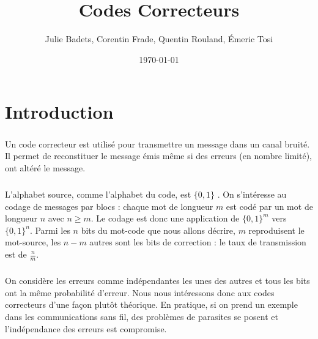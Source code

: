 \documentclass[a4paper,11pt]{report}
\title{Codes Correcteurs}
\author{Julie Badets, Corentin Frade, Quentin Rouland, Émeric Tosi}
\date{\today}
\begin{document}
    \maketitle{} %



    \setcounter{tocdepth}{1} %
    \renewcommand{\contentsname}{Sommaire} %
    \tableofcontents{} %
    \clearpage



\chapter*{Introduction}
        \paragraph{}
Un code correcteur est utilisé pour transmettre un message dans un canal bruité.
Il permet de reconstituer le message émis même si des erreurs (en nombre limité), ont altéré le message.
        \paragraph{}
L'alphabet source, comme l'alphabet du code, est $\{0,1\}$ .
On s'intéresse au codage de messages par blocs : chaque mot de longueur $m$ est codé par un mot de longueur $n$ avec $n \geq m$.
Le codage est donc une application de $\{0,1\}^{m}$  vers $\{0,1\}^{n}$.
Parmi les $n$ bits du mot-code que nous allons décrire, $m$ reproduisent le mot-source,
les $n-m$ autres sont les bits de correction : le taux de transmission est de $\frac{n}{m}$.
        \paragraph{}
On considère les erreurs comme indépendantes les unes des autres et tous les bits ont la même probabilité d'erreur.
Nous nous intéressons donc aux codes correcteurs d'une façon plutôt théorique.
En pratique, si on prend un exemple dans les communications sans fil,
des problèmes de parasites se posent et l'indépendance des erreurs est compromise.
\end{document}
